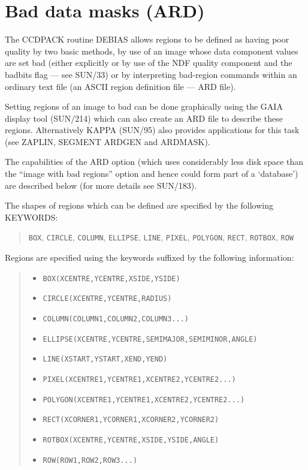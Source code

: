 \documentclass[twoside,11pt]{article}
\newcommand{\htmlref}[2]{#1}
\newcommand{\latexhtml}[2]{#1}
\newcommand{\xref}[3]{#1}
\newcommand{\xlabel}[1]{}
\renewcommand{\_}{\texttt{\symbol{95}}}
\newcommand{\ttsize}{\latexhtml{\small}{}}
\newenvironment{myquote}{\begin{quote}\ttsize}{\end{quote}}
\newcommand{\text}[1]{{\ttsize \tt #1}}
\newcommand{\xroutine}[1]{\htmlref{{\sc #1}}{#1}}
\begin{document}
\section{Bad data masks (ARD) \label{datamasks} \xlabel{datamasks}}
The CCDPACK routine \xroutine{DEBIAS} allows regions to be defined as
having poor quality by two basic methods, by use of an image whose data
component values are set bad (either explicitly or by use of the
NDF quality component and the badbits flag --- see \xref{SUN/33}{sun33}{})
or by interpreting bad-region commands within an ordinary text file
(an ASCII region definition file --- \xref{ARD}{sun183}{} file).

Setting regions of an image to bad can be done graphically using the
GAIA display tool (\xref{SUN/214}{sun214}{}) which can also create an
ARD file to describe these regions. Alternatively
\xref{KAPPA (SUN/95)}{sun95}{} also provides applications for this
task (see \xref{ZAPLIN}{sun95}{ZAPLIN}, \xref{SEGMENT}{sun95}{SEGMENT}
\xref{ARDGEN}{sun95}{ARDGEN} and \xref{ARDMASK}{sun95}{ARDMASK}).

The capabilities of the ARD option (which uses considerably less disk
space than the ``image with bad regions'' option and hence could form
part of a `database') are described below (for more details see
\xref{SUN/183}{sun183}{}).

The shapes of regions which can be defined are specified by the
following KEYWORDS:
\begin{myquote}
\text{BOX}, \text{CIRCLE}, \text{COLUMN}, \text{ELLIPSE}, \text{LINE},
\text{PIXEL}, \text{POLYGON}, \text{RECT}, \text{ROTBOX}, \text{ROW}
\end{myquote}

Regions are specified using the keywords suffixed by the following
information:
\begin{myquote}
\begin{itemize}
\item \text{BOX(XCENTRE,YCENTRE,XSIDE,YSIDE)}
\item \text{CIRCLE(XCENTRE,YCENTRE,RADIUS)}
\item \text{COLUMN(COLUMN1,COLUMN2,COLUMN3...)}
\item \text{ELLIPSE(XCENTRE,YCENTRE,SEMIMAJOR,SEMIMINOR,ANGLE)}
\item \text{LINE(XSTART,YSTART,XEND,YEND)}
\item \text{PIXEL(XCENTRE1,YCENTRE1,XCENTRE2,YCENTRE2...)}
\item \text{POLYGON(XCENTRE1,YCENTRE1,XCENTRE2,YCENTRE2...)}
\item \text{RECT(XCORNER1,YCORNER1,XCORNER2,YCORNER2)}
\item \text{ROTBOX(XCENTRE,YCENTRE,XSIDE,YSIDE,ANGLE)}
\item \text{ROW(ROW1,ROW2,ROW3...)}
\end{itemize}
\end{myquote}
\end{document}
